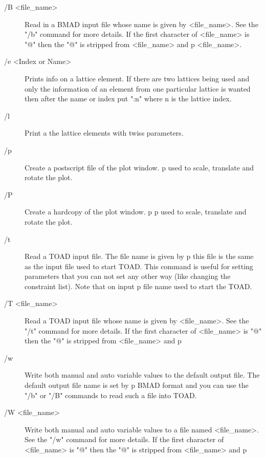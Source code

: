 \begin{description}
\item[/B <file_name>]   
Read in a BMAD input file whose name is given by <file_name>. See the
"/b" command for more details. If the first character of <file_name> is
"@" then the "@" is stripped from  <file_name> and p%
<file_name>.

\item[/e <Index or Name>]
Prints info on a lattice element. If there are two lattices being used
and only the information of an element from one particular lattice is wanted
then after the name or index put ":n" where n is the lattice index.

\item[/l]
Print a the lattice elements with twiss parameters.

\item[/p]
Create a postscript file of the plot window.
p%
used to scale, translate and rotate the plot.

\item[/P]
Create a hardcopy of the plot window.
p%
p%
used to scale, translate and rotate the plot.

\item[/t]
Read a TOAD input file. The file name is given by p%
this file is the same as the input file used to start TOAD. This command is
useful for setting parameters that you can not set any other way (like
changing the constraint list). Note that on input p%
file name used to start the TOAD.

\item[/T <file_name>]
Read a TOAD input file whose name is given by <file_name>.
See the "/t" command for more details.
If the first character of <file_name> is "@" then the "@" is stripped
from  <file_name> and p%

\item[/w]
Write both manual and auto variable values to the default output file. 
The default output file name is set by p%
BMAD format and you can use the "/b" or "/B" commands to read such a file into
TOAD.

\item[/W <file_name>]
Write both manual and auto variable values to a file named
<file_name>. See the "/w" command for more details.
If the first character of <file_name> is "@" then the "@" is stripped
from  <file_name> and p%


\end{description}
